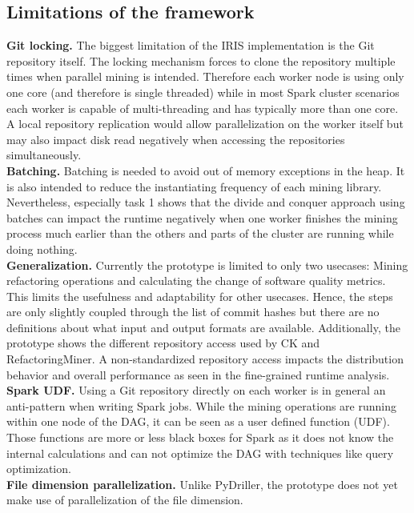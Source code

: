 \subsection{Limitations of the framework}
\textbf{Git locking.} The biggest limitation of the IRIS implementation is the Git repository itself. The locking mechanism forces to clone the repository multiple times when parallel mining is intended. Therefore each worker node is using only one core (and therefore is single threaded) while in most Spark cluster scenarios each worker is capable of multi-threading and has typically more than one core. A local repository replication would allow parallelization on the worker itself but may also impact disk read negatively when accessing the repositories simultaneously. \\
\textbf{Batching.} Batching is needed to avoid out of memory exceptions in the heap. It is also intended to reduce the instantiating frequency of each mining library. Nevertheless, especially task 1 shows that the divide and conquer approach using batches can impact the runtime negatively when one worker finishes the mining process much earlier than the others and parts of the cluster are running while doing nothing.\\
\textbf{Generalization.} Currently the prototype is limited to only two usecases: Mining refactoring operations and calculating the change of software quality metrics. This limits the usefulness and adaptability for other usecases. Hence, the steps are only slightly coupled through the list of commit hashes but there are no definitions about what input and output formats are available. Additionally, the prototype shows the different repository access used by CK and RefactoringMiner. A non-standardized repository access impacts the distribution behavior and overall performance as seen in the fine-grained runtime analysis.\\
\textbf{Spark UDF.} Using a Git repository directly on each worker is in general an anti-pattern when writing Spark jobs. While the mining operations are running within one node of the DAG, it can be seen as a user defined function (UDF). Those functions are more or less black boxes for Spark as it does not know the internal calculations and can not optimize the DAG with techniques like query optimization.\\
\textbf{File dimension parallelization.} Unlike PyDriller, the prototype does not yet make use of parallelization of the file dimension.
\label{sec:limitations}
